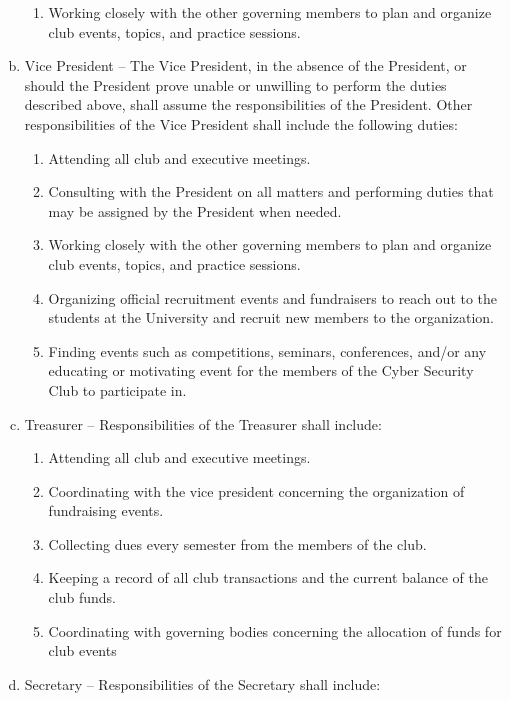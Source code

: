 \documentclass[10pt]{article}
\begin{document}
\begin{enumerate}[(a)]
\begin{enumerate}[1.]
        \item Working closely with the other governing members to plan and organize club events, topics, and practice sessions.
    \end{enumerate}
    \item Vice President -- The Vice President, in the absence of the President, or should the President prove unable or unwilling to perform the duties described above, shall assume the responsibilities of the President. Other responsibilities of the Vice President shall include the following duties:
    \begin{enumerate}[1.]
        \item Attending all club and executive meetings.
        \item Consulting with the President on all matters and performing duties that may be assigned by the President when needed.
        \item Working closely with the other governing members to plan and organize club events, topics, and practice sessions.
        \item Organizing official recruitment events and fundraisers to reach out to the students at the University and recruit new members to the organization.
        \item Finding events such as competitions, seminars, conferences, and/or any educating or motivating event for the members of the Cyber Security Club to participate in.
    \end{enumerate}
    \item Treasurer -- Responsibilities of the Treasurer shall include:
    \begin{enumerate}[1.]
        \item Attending all club and executive meetings.
        \item Coordinating with the vice president concerning the organization of fundraising events.
        \item Collecting dues every semester from the members of the club.
        \item Keeping a record of all club transactions and the current balance of the club funds.
        \item Coordinating with governing bodies concerning the allocation of funds for club events
    \end{enumerate}
    \item Secretary -- Responsibilities of the Secretary shall include: 

\end{enumerate}
\end{document}
